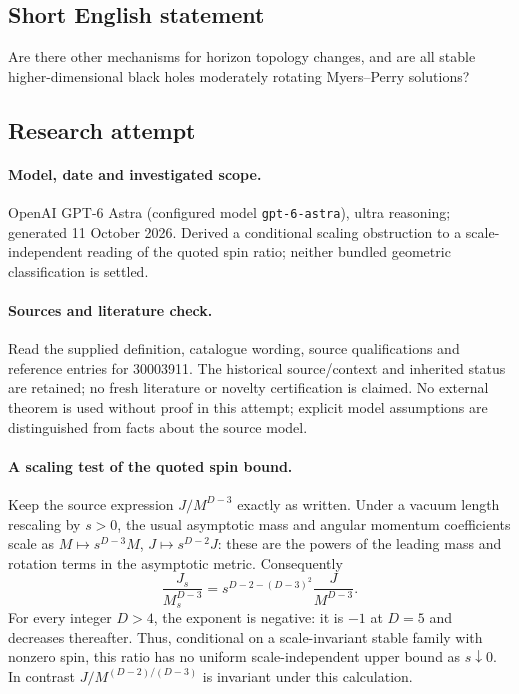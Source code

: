 \documentclass[11pt]{article}
\begin{document}
\subsection{Short English statement}
Are there other mechanisms for horizon topology changes, and are all stable higher-dimensional black holes moderately rotating Myers--Perry solutions?
\subsection{Research attempt}
\paragraph{Model, date and investigated scope.}
OpenAI GPT-6 Astra (configured model \texttt{gpt-6-astra}), ultra reasoning; generated 11 October 2026. Derived a conditional scaling obstruction to a scale-independent reading of the quoted spin ratio; neither bundled geometric classification is settled.

\paragraph{Sources and literature check.}
Read the supplied definition, catalogue wording, source qualifications and reference entries for 30003911. The historical source/context and inherited status are retained; no fresh literature or novelty certification is claimed. No external theorem is used without proof in this attempt; explicit model assumptions are distinguished from facts about the source model.

\paragraph{A scaling test of the quoted spin bound.} Keep the source expression \(J/M^{D-3}\) exactly as written. Under a vacuum length rescaling by \(s>0\), the usual asymptotic mass and angular momentum coefficients scale as \(M\mapsto s^{D-3}M\), \(J\mapsto s^{D-2}J\): these are the powers of the leading mass and rotation terms in the asymptotic metric. Consequently
\[
 \frac{J_s}{M_s^{D-3}}=s^{D-2-(D-3)^2}\frac{J}{M^{D-3}}.
\]
For every integer \(D>4\), the exponent is negative: it is \(-1\) at \(D=5\) and decreases thereafter. Thus, conditional on a scale-invariant stable family with nonzero spin, this ratio has no uniform scale-independent upper bound as \(s\downarrow0\). In contrast \(J/M^{(D-2)/(D-3)}\) is invariant under this calculation.
\end{document}

